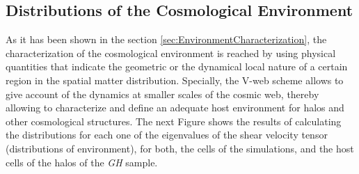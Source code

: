 	\subsection{Distributions of the Cosmological Environment}
	\label{subsec:Environment_Properties}



As it has been shown in the section \ref{sec:EnvironmentCharacterization},
the characterization of the cosmological environment is reached by using
physical quantities that indicate the geometric or the dynamical local 
nature of a certain region in the spatial matter distribution. Specially, 
the V-web scheme allows to give account of the dynamics at smaller scales 
of the cosmic web, thereby allowing to characterize and define an adequate 
host environment for halos and other cosmological structures. The next 
Figure shows the results of calculating the distributions for each one of
the eigenvalues of the shear velocity tensor (distributions of 
environment), for both, the cells of the simulations, and the host cells
of the halos of the \textit{GH} sample.


